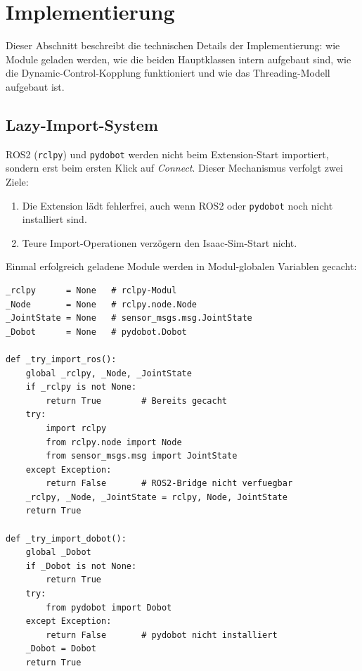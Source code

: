 \documentclass[11pt,a4paper]{article}
\begin{document}
\section{Implementierung}
\label{sec:impl}

Dieser Abschnitt beschreibt die technischen Details der Implementierung:
wie Module geladen werden, wie die beiden Hauptklassen intern aufgebaut
sind, wie die Dynamic-Control-Kopplung funktioniert und wie das
Threading-Modell aufgebaut ist.

\subsection{Lazy-Import-System}
\label{sec:lazyimport}

ROS2 (\texttt{rclpy}) und \texttt{pydobot} werden nicht beim
Extension-Start importiert, sondern erst beim ersten Klick auf
\textit{Connect}. Dieser Mechanismus verfolgt zwei Ziele:

\begin{enumerate}
  \item Die Extension lädt fehlerfrei, auch wenn ROS2 oder
        \texttt{pydobot} noch nicht installiert sind.
  \item Teure Import-Operationen verzögern den Isaac-Sim-Start nicht.
\end{enumerate}

Einmal erfolgreich geladene Module werden in Modul-globalen
Variablen gecacht:

\begin{lstlisting}[caption={Lazy-Import-Caches und \_try\_import\_ros()}]
_rclpy      = None   # rclpy-Modul
_Node       = None   # rclpy.node.Node
_JointState = None   # sensor_msgs.msg.JointState
_Dobot      = None   # pydobot.Dobot

def _try_import_ros():
    global _rclpy, _Node, _JointState
    if _rclpy is not None:
        return True        # Bereits gecacht
    try:
        import rclpy
        from rclpy.node import Node
        from sensor_msgs.msg import JointState
    except Exception:
        return False       # ROS2-Bridge nicht verfuegbar
    _rclpy, _Node, _JointState = rclpy, Node, JointState
    return True

def _try_import_dobot():
    global _Dobot
    if _Dobot is not None:
        return True
    try:
        from pydobot import Dobot
    except Exception:
        return False       # pydobot nicht installiert
    _Dobot = Dobot
    return True
\end{lstlisting}
\end{document}
